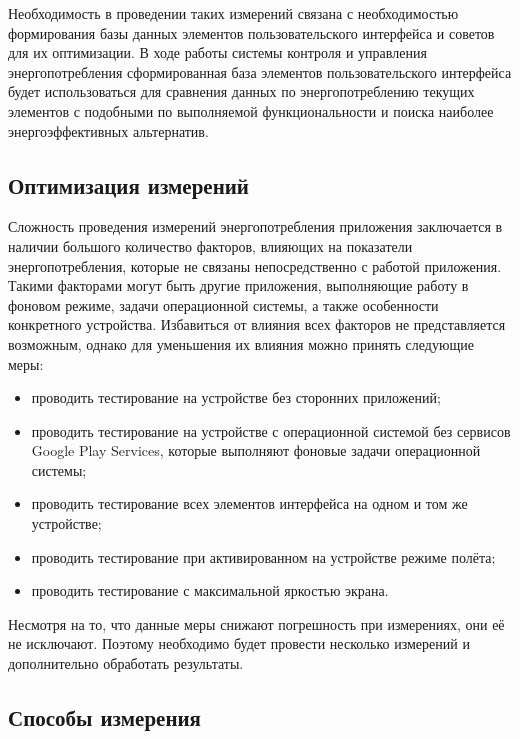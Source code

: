 \documentclass[a4paper,14pt]{extarticle} %
\begin{document}
	Необходимость в проведении таких измерений связана с необходимостью формирования базы данных элементов пользовательского интерфейса и советов для их оптимизации. В ходе работы системы контроля и управления энергопотребления сформированная база элементов пользовательского интерфейса будет использоваться для сравнения данных по энергопотреблению текущих элементов с подобными по выполняемой функциональности и поиска наиболее энергоэффективных альтернатив.
	
	\subsection{Оптимизация измерений}
	
	Сложность проведения измерений энергопотребления приложения заключается в наличии большого количество факторов, влияющих на показатели энергопотребления, которые не связаны непосредственно с работой приложения. Такими факторами могут быть другие приложения, выполняющие работу в фоновом режиме, задачи операционной системы, а также особенности конкретного устройства. Избавиться от влияния всех факторов не представляется возможным, однако для уменьшения их влияния можно принять следующие меры:
	\begin{itemize}
		\item проводить тестирование на устройстве без сторонних приложений;
		\item проводить тестирование на устройстве с операционной системой без сервисов Google Play Services, которые выполняют фоновые задачи операционной системы;
		\item проводить тестирование всех элементов интерфейса на одном и том же устройстве;
		\item проводить тестирование при активированном на устройстве режиме полёта;
		\item проводить тестирование с максимальной яркостью экрана.
	\end{itemize}

	Несмотря на то, что данные меры снижают погрешность при измерениях, они её не исключают. Поэтому необходимо будет провести несколько измерений и дополнительно обработать результаты.
	
	\subsection{Способы измерения}
	
\end{document}
